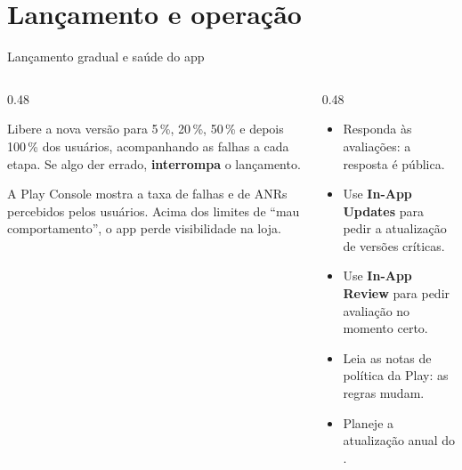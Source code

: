 \documentclass[aspectratio=169,10pt]{beamer}
\begin{document}
\section{Lançamento e operação}

\begin{frame}{Lançamento gradual e saúde do app}
  \begin{columns}[T]
    \begin{column}{0.48\textwidth}
      \begin{conceito}
        Libere a nova versão para 5\,\%, 20\,\%, 50\,\% e depois 100\,\% dos usuários, acompanhando as falhas a cada etapa. Se algo der errado, \textbf{interrompa} o lançamento.
      \end{conceito}
      \begin{conceito}
        A Play Console mostra a taxa de falhas e de ANRs percebidos pelos usuários. Acima dos limites de ``mau comportamento'', o app perde visibilidade na loja.
      \end{conceito}
    \end{column}
    \begin{column}{0.48\textwidth}
      \begin{dica}
        \begin{itemize}
          \item Responda às avaliações: a resposta é pública.
          \item Use \textbf{In-App Updates} para pedir a atualização de versões críticas.
          \item Use \textbf{In-App Review} para pedir avaliação no momento certo.
          \item Leia as notas de política da Play: as regras mudam.
          \item Planeje a atualização anual do .
        \end{itemize}
      \end{dica}
    \end{column}
  \end{columns}
\end{frame}
\end{document}
